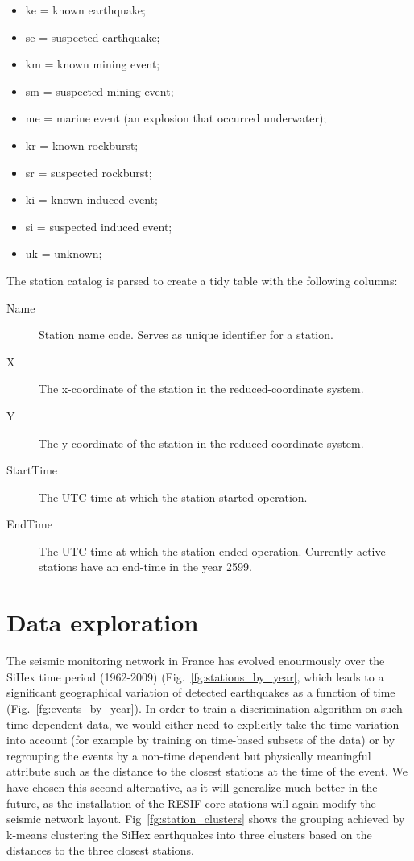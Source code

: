 \begin{description}
\begin{itemize}
\item ke = known earthquake;
\item se = suspected earthquake;
\item km = known mining event;
\item sm = suspected mining event;
\item me = marine event (an explosion that occurred underwater);
\item kr = known rockburst;
\item sr = suspected rockburst;
\item ki = known induced event;
\item si = suspected induced event;
\item uk = unknown;
\end{itemize}
\end{description}
The station catalog is parsed to create a tidy table with the following columns:
\begin{description}
\item[Name] Station name code. Serves as unique identifier for a station.
\item[X] The x-coordinate of the station in the reduced-coordinate system.   
\item[Y] The y-coordinate of the station in the reduced-coordinate system.   
\item[StartTime] The UTC time at which the station started operation.
\item[EndTime] The UTC time at which the station ended operation. Currently
active stations have an end-time in the year 2599.
\end{description}

\section{Data exploration}
The seismic monitoring network in France has evolved enourmously over the SiHex
time period (1962-2009) (Fig.~\ref{fg:stations_by_year}, which leads to a
significant geographical variation of detected earthquakes as a function of
time (Fig.~\ref{fg:events_by_year}). In order to train a discrimination
algorithm on such time-dependent data, we would either need to explicitly take
the time variation into account (for example by training on time-based subsets
of the data) or by regrouping the events by a non-time dependent but physically
meaningful attribute such as the distance to the closest stations at the
time of the event. We have chosen this second alternative, as it will
generalize much better in the future, as the installation of the RESIF-core
stations will again modify the seismic network layout.
Fig~\ref{fg:station_clusters} shows the grouping achieved by k-means clustering
the SiHex earthquakes into three clusters based on the distances to the three
closest stations.

